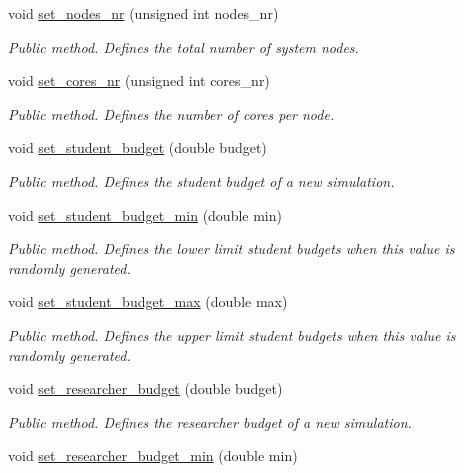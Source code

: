 \begin{DoxyCompactItemize}
void \hyperlink{classConfiguration_ac74a221224fbf7db75c3afa47fba2d61}{set\+\_\+nodes\+\_\+nr} (unsigned int nodes\+\_\+nr)
\begin{DoxyCompactList}\small\item\em Public method. Defines the total number of system nodes. \end{DoxyCompactList}\item 
void \hyperlink{classConfiguration_a299244e0d054564921a3344b14e94973}{set\+\_\+cores\+\_\+nr} (unsigned int cores\+\_\+nr)
\begin{DoxyCompactList}\small\item\em Public method. Defines the number of cores per node. \end{DoxyCompactList}\item 
void \hyperlink{classConfiguration_a00fb5adcb5145810133ef68a662dca91}{set\+\_\+student\+\_\+budget} (double budget)
\begin{DoxyCompactList}\small\item\em Public method. Defines the student budget of a new simulation. \end{DoxyCompactList}\item 
void \hyperlink{classConfiguration_ae6cc1bfec9271811e94df8a6bba264f0}{set\+\_\+student\+\_\+budget\+\_\+min} (double min)
\begin{DoxyCompactList}\small\item\em Public method. Defines the lower limit student budgets when this value is randomly generated. \end{DoxyCompactList}\item 
void \hyperlink{classConfiguration_aba1e5f9fe84879c3628382096015cd94}{set\+\_\+student\+\_\+budget\+\_\+max} (double max)
\begin{DoxyCompactList}\small\item\em Public method. Defines the upper limit student budgets when this value is randomly generated. \end{DoxyCompactList}\item 
void \hyperlink{classConfiguration_a92a48764d5717464989aed435de76bc6}{set\+\_\+researcher\+\_\+budget} (double budget)
\begin{DoxyCompactList}\small\item\em Public method. Defines the researcher budget of a new simulation. \end{DoxyCompactList}\item 
void \hyperlink{classConfiguration_a8fb6a2c896ca9a98ffa605b84b6ddde7}{set\+\_\+researcher\+\_\+budget\+\_\+min} (double min)

\end{DoxyCompactItemize}
